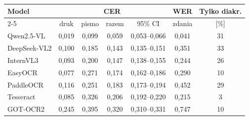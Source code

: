 \begin{tabular}{lcccccc}
\toprule
Model & \multicolumn{4}{c}{CER} & WER & Tylko diakr. \\
\cmidrule(lr){2-5}
 & druk & pismo & razem & 95\% CI & zdania & [\%] \\
\midrule
Qwen2.5-VL & 0,019 & 0,099 & 0,059 & 0,053--0,066 & 0,041 & 31 \\
DeepSeek-VL2 & 0,100 & 0,185 & 0,143 & 0,135--0,151 & 0,351 & 33 \\
InternVL3 & 0,093 & 0,200 & 0,147 & 0,138--0,155 & 0,244 & 26 \\
EasyOCR & 0,077 & 0,271 & 0,174 & 0,162--0,186 & 0,290 & 10 \\
PaddleOCR & 0,116 & 0,251 & 0,183 & 0,173--0,194 & 0,452 & 29 \\
Tesseract & 0,085 & 0,326 & 0,206 & 0,192--0,220 & 0,215 & 3 \\
GOT-OCR2 & 0,245 & 0,395 & 0,320 & 0,310--0,331 & 0,747 & 10 \\
\bottomrule
\end{tabular}
